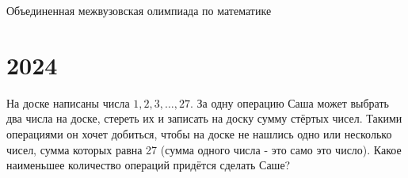 \documentclass[11pt, a4paper]{common/document_template}
\begin{document}
\begin{titlepage}
  \begin{center}
	\Huge{Объединенная межвузовская олимпиада по математике}
  \end{center}
\end{titlepage}  

\chapter{2024}

\begin{exercise}
На доске написаны числа $1, 2, 3, \dots, 27$. За одну операцию Саша может
выбрать два числа на доске, стереть их и записать на доску сумму стёртых чисел. Такими операциями он хочет добиться, чтобы на доске не нашлись одно или несколько чисел, сумма которых равна 27 (сумма одного числа - это само это число). Какое наименьшее количество операций придётся сделать Саше?
\end{exercise}
\end{document}

